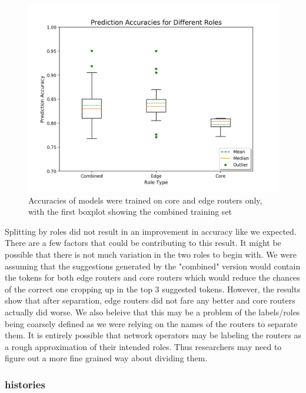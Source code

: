 \begin{figure}[H]
	\centering
	\includegraphics[width=\textwidth]{roles.png}
	\caption{Accuracies of models were trained on core and edge routers only, with the first boxplot showing the combined training set}
\end{figure}

Splitting by roles did not result in an improvement in accuracy like we expected. There are a few factors that could be contributing to this result. It might be possible that there is not much variation in the two roles to begin with. We were assuming that the suggestions generated by the "combined" version would contain the tokens for both edge routers and core routers which would reduce the chances of the correct one cropping up in the top 3 suggested tokens. However, the results show that after separation, edge routers did not fare any better and core routers actually did worse. We also beleive that this may be a problem of the labels/roles being coarsely defined as we were relying on the names of the routers to separate them. It is entirely possible that network operators may be labeling the routers as a rough approximation of their intended roles. Thus researchers may need to figure out a more fine grained way about dividing them.

\subsubsection{histories}


